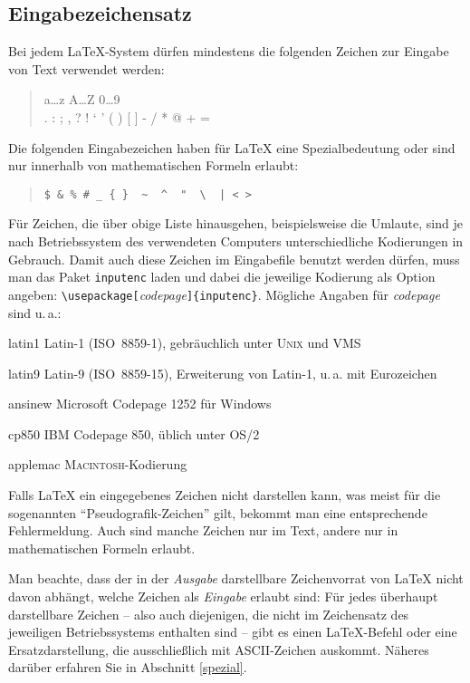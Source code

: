 \subsection{Eingabezeichensatz}\label{inputenc}

Bei jedem \LaTeX-System dürfen mindestens die folgenden
Zeichen zur Eingabe von Text verwendet werden:
\begin{quote}
  \ttfamily
  a\dots z A\dots Z 0\dots 9 \\
  . : ; , ? ! ` ' ( ) [ ] - / * @ + =
\end{quote}
Die folgenden Eingabezeichen haben für \LaTeX{} eine Spezialbedeutung
oder sind nur innerhalb von mathematischen Formeln erlaubt:
\begin{quote}
\verb.$ & % # _ { }  ~  ^  "  \  | < >.
\end{quote}
Für Zeichen, die über obige Liste hinausgehen, beispielsweise die Umlaute,
sind je nach Betriebssystem des verwendeten Computers 
unterschiedliche Kodierungen in Gebrauch.  Damit auch diese Zeichen im 
Eingabefile benutzt werden dürfen,  muss man das Paket 
\texttt{inputenc} laden und dabei die jeweilige Kodierung als 
Option angeben: \verb:\usepackage[:\textit{codepage}\verb:]{inputenc}:.
Mögliche Angaben für \textit{codepage} sind u.\,a.:
\begin{ttdescription}
  \item[latin1] Latin-1 (ISO~8859-1), gebräuchlich unter \textsc{Unix} und VMS
  \item[latin9] Latin-9 (ISO~8859-15), Erweiterung von Latin-1, u.\,a. mit Eurozeichen
  \item[ansinew] Microsoft Codepage 1252 für Windows
  \item[cp850] IBM Codepage 850, üblich unter OS/2
  \item[applemac] \textsc{Macintosh}-Kodierung
\end{ttdescription}
Falls \LaTeX{} ein eingegebenes Zeichen nicht darstellen
kann, was meist für die sogenannten "`Pseudografik-Zeichen"' 
gilt,  bekommt man eine entsprechende Fehlermeldung.
Auch sind manche Zeichen nur im Text, andere nur in mathematischen 
Formeln erlaubt.

Man beachte, dass der in der \emph{Ausgabe} darstellbare Zeichenvorrat 
von \LaTeX{} nicht davon abhängt, welche Zeichen als \emph{Eingabe} erlaubt 
sind:
Für jedes überhaupt darstellbare Zeichen -- also auch diejenigen, die
nicht im Zeichensatz des jeweiligen Betriebssystems enthalten sind --
gibt es einen 
\LaTeX-Befehl oder eine Ersatzdarstellung, die ausschließlich mit 
ASCII-Zeichen auskommt.  Näheres darüber erfahren Sie
in Abschnitt \ref{spezial}.



\endinput
